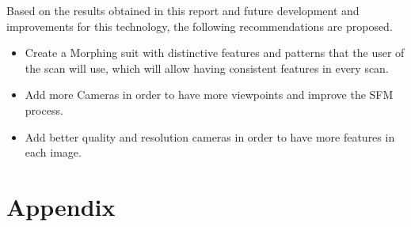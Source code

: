 \documentclass[12pt]{report}
\begin{document}
Based on the results obtained in this report and future development and improvements for this technology, the following recommendations are proposed.

\begin{itemize}
  \item Create a Morphing suit with distinctive features and patterns that the user of the scan will use, which will allow having consistent features in every scan.
  \item Add more Cameras in order to have more viewpoints and improve the SFM process.
  \item Add better quality and resolution cameras in order to have more features in each image.
\end{itemize}




\nocite{*}   %




\appendix
\chapter{\vspace{-5.5cm}Appendix}


\end{document}
